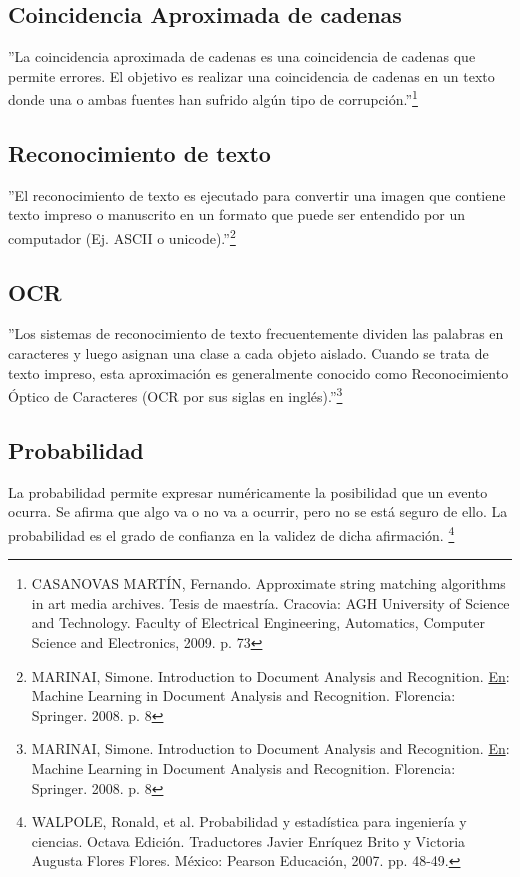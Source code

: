 \subsection{Coincidencia Aproximada de cadenas}  
''La coincidencia aproximada de cadenas es una coincidencia de cadenas 
que permite errores. El objetivo es realizar una coincidencia de 
cadenas en un texto donde una o ambas fuentes han sufrido alg\'un tipo 
de corrupci\'on.''\footnote{CASANOVAS MART\'IN, Fernando. Approximate string matching algorithms in art media archives.
Tesis de maestr\'ia. Cracovia:  AGH University of Science and Technology.
Faculty of Electrical Engineering, Automatics, Computer Science and Electronics, 2009. p. 73}

\subsection{Reconocimiento de texto} 
''El reconocimiento de texto es ejecutado para convertir una imagen 
que contiene texto impreso o manuscrito en un formato que puede ser 
entendido por un computador (Ej. ASCII o unicode).''\footnote{MARINAI, Simone. Introduction to Document Analysis and Recognition. 
\underline{En}: Machine Learning in Document Analysis and Recognition. Florencia: Springer. 2008. p. 8}

\subsection{OCR}
''Los sistemas de reconocimiento de texto frecuentemente dividen las 
palabras en caracteres y luego asignan una clase a cada objeto aislado.
Cuando se trata de texto impreso, esta aproximaci\'on es generalmente 
conocido como Reconocimiento \'Optico de Caracteres (OCR por sus siglas 
en ingl\'es).''\footnote{MARINAI, Simone. Introduction to Document Analysis and Recognition. 
\underline{En}: Machine Learning in Document Analysis and Recognition. Florencia: Springer. 2008. p. 8}


\subsection{Probabilidad}
La probabilidad permite expresar num\'ericamente la posibilidad que un 
evento ocurra.  Se afirma que algo va o no va a ocurrir, pero no se 
est\'a seguro de ello. La probabilidad es el grado de confianza en la 
validez de dicha afirmaci\'on. \footnote{ WALPOLE, Ronald, et al. Probabilidad y estad\'istica para ingenier\'ia y ciencias. Octava Edici\'on. Traductores Javier Enr\'iquez Brito y Victoria Augusta Flores Flores. M\'exico: Pearson Educaci\'on,  2007. pp. 48-49.}

\pagebreak